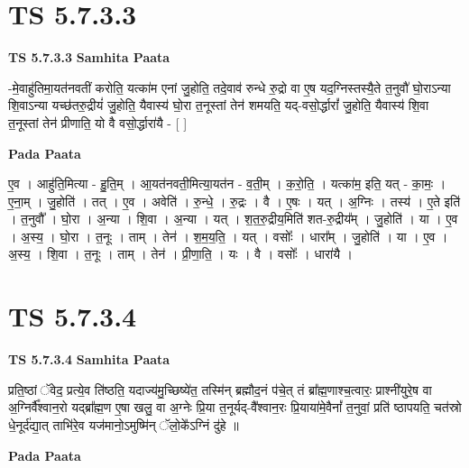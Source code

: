 \documentclass[17pt]{extarticle}
\begin{document}

\section{ TS 5.7.3.3 }

\textbf{TS 5.7.3.3 } \newline
\textbf{Samhita Paata} \newline

-मे॒वाहु॑तिमा॒यत॑नवतीं करोति॒ यत्का॑म एनां जु॒होति॒ तदे॒वाव॑ रुन्धे रु॒द्रो वा ए॒ष यद॒ग्निस्तस्यै॒ते त॒नुवौ॑ घो॒राऽन्या शि॒वाऽन्या यच्छ॑तरु॒द्रीयं॑ जु॒होति॒ यैवास्य॑ घो॒रा त॒नूस्तां तेन॑ शमयति॒ यद्-वसो॒र्द्धारां᳚ जु॒होति॒ यैवास्य॑ शि॒वा त॒नूस्तां तेन॑ प्रीणाति॒ यो वै वसो॒र्द्धारा॑यै - [  ] \newline

\textbf{Pada Paata} \newline

ए॒व । आहु॑ति॒मित्या - हु॒ति॒म् । आ॒यत॑नवती॒मित्या॒यत॑न - व॒ती॒म् । क॒रो॒ति॒ । यत्का॑म॒ इति॒ यत् - का॒मः॒ । ए॒ना॒म् । जु॒होति॑ । तत् । ए॒व । अवेति॑ । रु॒न्धे॒ । रु॒द्रः । वै । ए॒षः । यत् । अ॒ग्निः । तस्य॑ । ए॒ते इति॑ । त॒नुवौ᳚ । घो॒रा । अ॒न्या । शि॒वा । अ॒न्या । यत् । श॒त॒रु॒द्रीय॒मिति॑ शत-रु॒द्रीय᳚म् । जु॒होति॑ । या । ए॒व । अ॒स्य॒ । घो॒रा । त॒नूः । ताम् । तेन॑ । श॒म॒य॒ति॒ । यत् । वसोः᳚ । धारा᳚म् । जु॒होति॑ । या । ए॒व । अ॒स्य॒ । शि॒वा । त॒नूः । ताम् । तेन॑ । प्री॒णा॒ति॒ । यः । वै । वसोः᳚ । धारा॑यै ।  \newline





\section{ TS 5.7.3.4 }

\textbf{TS 5.7.3.4 } \newline
\textbf{Samhita Paata} \newline

प्रति॒ष्ठां ॅवेद॒ प्रत्ये॒व ति॑ष्ठति॒ यदाज्य॑मु॒च्छिष्ये॑त॒ तस्मि॑न् ब्रह्मौद॒नं प॑चे॒त् तं ब्रा᳚ह्म॒णाश्च॒त्वारः॒ प्राश्नी॑युरे॒ष वा अ॒ग्निर्वै᳚श्वान॒रो यद्ब्रा᳚ह्म॒ण ए॒षा खलु॒ वा अ॒ग्नेः प्रि॒या त॒नूर्यद्-वै᳚श्वान॒रः प्रि॒याया॑मे॒वैनां᳚ त॒नुवां॒ प्रति॑ ष्ठापयति॒ चत॑स्रो धे॒नूर्द॑द्या॒त् ताभि॑रे॒व यज॑मानो॒ऽमुष्मि॑न् ॅलो॒के᳚ऽग्निं दु॑हे ॥ \newline

\textbf{Pada Paata} \newline
\end{document}
